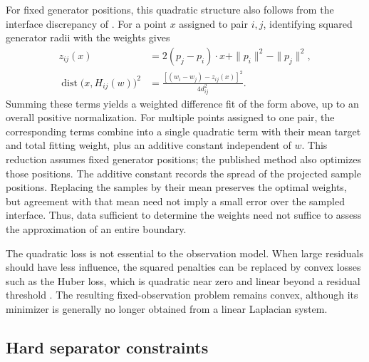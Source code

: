 For fixed generator positions, this quadratic structure also follows from
the interface discrepancy of \citet{Spettl2016}.
For a point $x$ assigned to pair $i,j$, identifying squared generator
radii with the weights gives
\[
\begin{aligned}
z_{ij}(x)
 &=2(p_j-p_i)\cdot x+\|p_i\|^2-\|p_j\|^2,\\
\operatorname{dist}\bigl(x,H_{ij}(w)\bigr)^2
 &=\frac{[(w_i-w_j)-z_{ij}(x)]^2}{4d_{ij}^2}.
\end{aligned}
\]
Summing these terms yields a weighted difference fit of the form above,
up to an overall positive normalization. For multiple points assigned to
one pair, the corresponding terms combine into a single quadratic term
with their mean target and total fitting weight, plus an additive constant
independent of $w$.
This reduction assumes fixed generator positions; the published method
also optimizes those positions.
The additive constant records the spread of the projected sample positions.
Replacing the samples by their mean preserves the optimal weights, but
agreement with that mean need not imply a small error over the sampled
interface. Thus, data sufficient to determine the weights need not suffice
to assess the approximation of an entire boundary.

The quadratic loss is not essential to the observation model. When large residuals should have less influence, the squared penalties can be replaced by convex losses such as the Huber loss, which is quadratic near zero and linear beyond a residual threshold \citep{Huber1964}. The resulting fixed-observation problem remains convex, although its minimizer is generally no longer obtained from a linear Laplacian system.

\subsection{Hard separator constraints}

